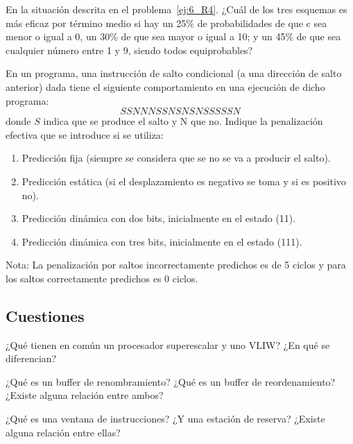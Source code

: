 \begin{ejercicio}
    En la situación descrita en el problema~\ref{ej:6_R4}. ¿Cuál de los tres esquemas es más eficaz por término medio si hay un 25\% de probabilidades de que c sea menor o igual a 0, un 30\% de que sea mayor o igual a 10; y un 45\% de que sea cualquier número entre 1 y 9, siendo todos equiprobables? 
\end{ejercicio}

\begin{ejercicio}
En un programa, una instrucción de salto condicional (a una dirección de salto anterior) dada tiene el siguiente comportamiento en una ejecución de dicho programa:    
\begin{equation*}
    SSNNNSSNSNSNSSSSSN
\end{equation*}
donde $S$ indica que se produce el salto y N que no. Indique la penalización efectiva que se introduce si se utiliza:
\begin{enumerate}
    \item Predicción fija (siempre se considera que se no se va a producir el salto).
    \item Predicción estática (si el desplazamiento es negativo se toma y si es positivo no).
    \item Predicción dinámica con dos bits, inicialmente en el estado (11).
    \item Predicción dinámica con tres bits, inicialmente en el estado (111).
\end{enumerate}
Nota: La penalización por saltos incorrectamente predichos es de 5 ciclos y para los saltos correctamente predichos es 0 ciclos.
\end{ejercicio}

\subsection{Cuestiones}

\begin{cuestion}
¿Qué tienen en común un procesador superescalar y uno VLIW? ¿En qué se diferencian?
\end{cuestion}

\begin{cuestion}
   ¿Qué es un buffer de renombramiento? ¿Qué es un buffer de reordenamiento? ¿Existe alguna relación entre ambos? 
\end{cuestion}

\begin{cuestion}
   ¿Qué es una ventana de instrucciones? ¿Y una estación de reserva? ¿Existe alguna relación entre ellas? 
\end{cuestion}

